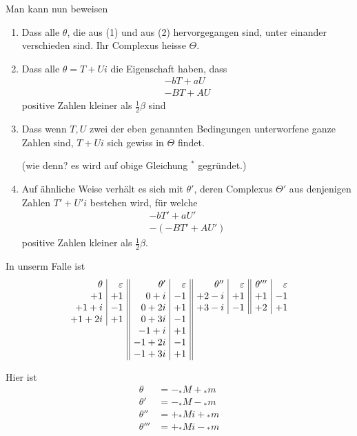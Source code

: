 %
Man kann nun beweisen
\begin{enumerate}\renewcommand{\labelenumi}{\arabic{enumi})}
\item Dass alle $\theta$, die aus (1) und aus (2) hervorgegangen sind, unter einander verschieden sind. Ihr Complexus heisse $\Theta$.
\item Dass alle $\theta=T+Ui$ die Eigenschaft haben, dass
\[
\begin{gathered}
-bT+aU\\
-BT+AU
\end{gathered}
\]
positive Zahlen kleiner als $\frac12\beta$ sind
\item Dass wenn $T,U$ zwei der eben genannten Bedingungen unterworfene ganze Zahlen sind, $T+Ui$ sich gewiss in $\Theta$ findet.\par
(wie denn? es wird auf obige Gleichung $^*$ gegründet.)
\item Auf ähnliche Weise verhält es sich mit $\theta'$, deren Complexus $\Theta'$ aus denjenigen Zahlen $T'+U'i$ bestehen wird, für welche
\[
\begin{gathered}
-bT'+aU'\\
-(-BT'+AU')
\end{gathered}
\]
positive Zahlen kleiner als $\frac12\beta$.
\end{enumerate}

In unserm Falle ist
\[
\setlength{\arraycolsep}{4pt}
\begin{array}{r|r||r|r||r|r||r|r}
\theta&\varepsilon&\theta'&\varepsilon&\theta''&\varepsilon&\theta'''&\varepsilon\\
+1&+1&0+i&-1&+2-i&+1&+1&-1\\
+1+i&-1&0+2i&+1&+3-i&-1&+2&+1\\
+1+2i&+1&0+3i&-1&\multicolumn{4}{c}{}\\
\multicolumn{2}{c||}{}&-1+i&+1&\multicolumn{4}{c}{}\\
\multicolumn{2}{c||}{}&-1+2i&-1&\multicolumn{4}{c}{}\\
\multicolumn{2}{c||}{}&-1+3i&+1&\multicolumn{4}{c}{}
\end{array}
\]

Hier ist
\[
\begin{aligned}
\theta&=-{}_*M+{}_*m\\
\theta'&=-{}_*M-{}_*m\\
\theta''&=+{}_*Mi+{}_*m\\
\theta'''&=+{}_*Mi-{}_*m
\end{aligned}
\]

